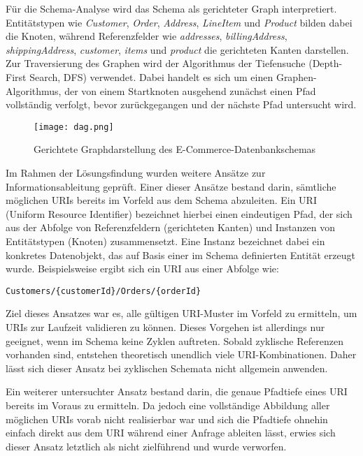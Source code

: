 Für die Schema-Analyse wird das Schema als gerichteter Graph interpretiert. Entitätstypen wie \textit{Customer}, \textit{Order}, \textit{Address}, \textit{LineItem} und \textit{Product} bilden dabei die Knoten, während Referenzfelder wie \textit{addresses}, \textit{billingAddress}, \textit{shippingAddress}, \textit{customer}, \textit{items} und \textit{product} die gerichteten Kanten darstellen. Zur Traversierung des Graphen wird der Algorithmus der Tiefensuche (Depth-First Search, DFS) verwendet. Dabei handelt es sich um einen Graphen-Algorithmus, der von einem Startknoten ausgehend zunächst einen Pfad vollständig verfolgt, bevor zurückgegangen und der nächste Pfad untersucht wird. 

\begin{figure}[H]
    \centering
    \texttt{[image: dag.png]}
    \caption{Gerichtete Graphdarstellung des E-Commerce-Datenbankschemas}
    \label{fig:dag}
\end{figure}
\newpage

Im Rahmen der Lösungsfindung wurden weitere Ansätze zur Informationsableitung geprüft. Einer dieser Ansätze bestand darin, sämtliche möglichen URIs bereits im Vorfeld aus dem Schema abzuleiten. Ein URI (Uniform Resource Identifier) bezeichnet hierbei einen eindeutigen Pfad, der sich aus der Abfolge von Referenzfeldern (gerichteten Kanten) und Instanzen von Entitätstypen (Knoten) zusammensetzt. Eine Instanz bezeichnet dabei ein konkretes Datenobjekt, das auf Basis einer im Schema definierten Entität erzeugt wurde. Beispielsweise ergibt sich ein URI aus einer Abfolge wie:

\begin{center}
\texttt{Customers/\{customerId\}/Orders/\{orderId\}}
\end{center}

Ziel dieses Ansatzes war es, alle gültigen URI-Muster im Vorfeld zu ermitteln, um URIs zur Laufzeit validieren zu können. Dieses Vorgehen ist allerdings nur geeignet, wenn im Schema keine Zyklen auftreten. Sobald zyklische Referenzen vorhanden sind, entstehen theoretisch unendlich viele URI-Kombinationen. Daher lässt sich dieser Ansatz bei zyklischen Schemata nicht allgemein anwenden.

Ein weiterer untersuchter Ansatz bestand darin, die genaue Pfadtiefe eines URI bereits im Voraus zu ermitteln. Da jedoch eine vollständige Abbildung aller möglichen URIs vorab nicht realisierbar war und sich die Pfadtiefe ohnehin einfach direkt aus dem URI während einer Anfrage ableiten lässt, erwies sich dieser Ansatz letztlich als nicht zielführend und wurde verworfen.

